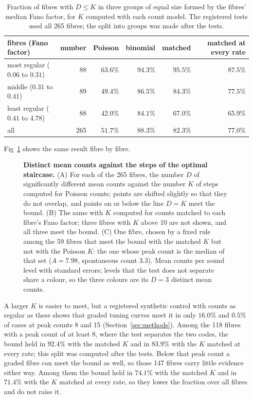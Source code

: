 \documentclass[10pt,letterpaper]{article}
\begin{document}
\begin{table}[tp]
\caption{Fraction of fibres with $D\le K$ in three groups of equal size formed by the fibres' median Fano factor, for $K$ computed
with each count model. The registered tests used all 265 fibres; the split into groups was made after the tests.}\label{tab:thirds}
\centering
\small
\begin{tabular}{lrrrrr}
\hline
fibres (Fano factor) & number & Poisson & binomial & matched & matched at every rate\\
\hline
most regular ($0.06$ to $0.31$) & 88 & $63.6\%$ & $94.3\%$ & $95.5\%$ & $87.5\%$\\
middle ($0.31$ to $0.41$) & 89 & $49.4\%$ & $86.5\%$ & $84.3\%$ & $77.5\%$\\
least regular ($0.41$ to $4.78$) & 88 & $42.0\%$ & $84.1\%$ & $67.0\%$ & $65.9\%$\\
all & 265 & $51.7\%$ & $88.3\%$ & $82.3\%$ & $77.0\%$\\
\hline
\end{tabular}
\end{table}
Fig~\ref{fig:dk} shows the same result fibre by fibre.

\begin{figure}[!h]
\centering
\caption{\textbf{Distinct mean counts against the steps of the optimal staircase.} (A) For each of the 265 fibres, the number $D$ of
significantly different mean counts against the number $K$ of steps computed for Poisson counts; points are shifted slightly so that
they do not overlap, and points on or below the line $D=K$ meet the bound. (B) The same with $K$ computed for counts matched to each
fibre's Fano factor; three fibres with $K$ above 10 are not shown, and all three meet the bound. (C) One fibre, chosen by a fixed rule
among the 59 fibres that meet the bound with the matched $K$ but not with the Poisson $K$: the one whose peak count is the median of
that set ($A=7.98$, spontaneous count $3.3$). Mean counts per sound level with standard errors; levels that the test does not separate
share a colour, so the three colours are its $D=3$ distinct mean counts.}\label{fig:dk}
\end{figure}

A larger $K$ is easier to meet, but a registered synthetic control with counts as regular as these shows that graded tuning curves
meet it in only $16.0\%$ and $0.5\%$ of cases at peak counts 8 and 15 (Section~\ref{sec:methods}). Among the 118 fibres with a peak
count of at least 8, where the test separates the two codes, the bound held in $92.4\%$ with the matched $K$ and in $83.9\%$ with
the $K$ matched at every rate; this split was computed after the tests. Below that peak count a graded fibre can meet the bound as well, so those 147 fibres carry little evidence either way.
Among them the bound held in $74.1\%$ with the matched $K$ and in $71.4\%$ with the $K$ matched at every rate, so they lower the fraction over all fibres and do not raise it.
\end{document}
